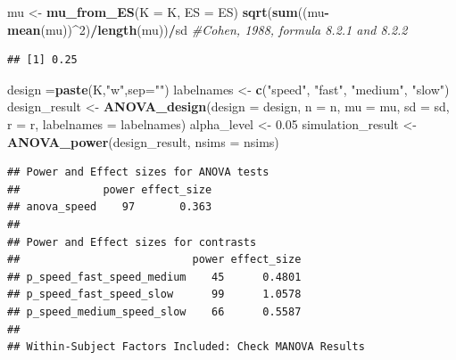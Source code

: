 \documentclass[]{book}
\newenvironment{Shaded}{\begin{snugshade}}{\end{snugshade}}
\newcommand{\CommentTok}[1]{\textcolor[rgb]{0.56,0.35,0.01}{\textit{#1}}}
\newcommand{\DataTypeTok}[1]{\textcolor[rgb]{0.13,0.29,0.53}{#1}}
\newcommand{\DecValTok}[1]{\textcolor[rgb]{0.00,0.00,0.81}{#1}}
\newcommand{\FloatTok}[1]{\textcolor[rgb]{0.00,0.00,0.81}{#1}}
\newcommand{\KeywordTok}[1]{\textcolor[rgb]{0.13,0.29,0.53}{\textbf{#1}}}
\newcommand{\NormalTok}[1]{#1}
\newcommand{\OperatorTok}[1]{\textcolor[rgb]{0.81,0.36,0.00}{\textbf{#1}}}
\newcommand{\StringTok}[1]{\textcolor[rgb]{0.31,0.60,0.02}{#1}}
\begin{document}
\begin{Shaded}
\begin{Highlighting}[]
\NormalTok{mu <-}\StringTok{ }\KeywordTok{mu_from_ES}\NormalTok{(}\DataTypeTok{K =}\NormalTok{ K, }\DataTypeTok{ES =}\NormalTok{ ES)}
\KeywordTok{sqrt}\NormalTok{(}\KeywordTok{sum}\NormalTok{((mu}\OperatorTok{-}\KeywordTok{mean}\NormalTok{(mu))}\OperatorTok{^}\DecValTok{2}\NormalTok{)}\OperatorTok{/}\KeywordTok{length}\NormalTok{(mu))}\OperatorTok{/}\NormalTok{sd }\CommentTok{#Cohen, 1988, formula 8.2.1 and 8.2.2}
\end{Highlighting}
\end{Shaded}

\begin{verbatim}
## [1] 0.25
\end{verbatim}

\begin{Shaded}
\begin{Highlighting}[]
\NormalTok{design =}\KeywordTok{paste}\NormalTok{(K,}\StringTok{"w"}\NormalTok{,}\DataTypeTok{sep=}\StringTok{""}\NormalTok{)}
\NormalTok{labelnames <-}\StringTok{ }\KeywordTok{c}\NormalTok{(}\StringTok{"speed"}\NormalTok{, }\StringTok{"fast"}\NormalTok{, }\StringTok{"medium"}\NormalTok{, }\StringTok{"slow"}\NormalTok{)}
\NormalTok{design_result <-}\StringTok{ }\KeywordTok{ANOVA_design}\NormalTok{(}\DataTypeTok{design =}\NormalTok{ design,}
                   \DataTypeTok{n =}\NormalTok{ n, }
                   \DataTypeTok{mu =}\NormalTok{ mu, }
                   \DataTypeTok{sd =}\NormalTok{ sd, }
                   \DataTypeTok{r =}\NormalTok{ r, }
                   \DataTypeTok{labelnames =}\NormalTok{ labelnames)}
\NormalTok{alpha_level <-}\StringTok{ }\FloatTok{0.05}
\NormalTok{simulation_result <-}\StringTok{ }\KeywordTok{ANOVA_power}\NormalTok{(design_result, }\DataTypeTok{nsims =}\NormalTok{ nsims)}
\end{Highlighting}
\end{Shaded}

\begin{verbatim}
## Power and Effect sizes for ANOVA tests
##             power effect_size
## anova_speed    97       0.363
## 
## Power and Effect sizes for contrasts
##                           power effect_size
## p_speed_fast_speed_medium    45      0.4801
## p_speed_fast_speed_slow      99      1.0578
## p_speed_medium_speed_slow    66      0.5587
## 
## Within-Subject Factors Included: Check MANOVA Results
\end{verbatim}
\end{document}
